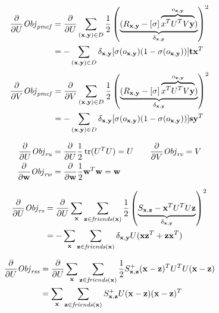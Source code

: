 \begin{align}
\frac{\partial}{\partial U} \mathit{Obj}_{\mathit{pmcf}} & = \frac{\partial}{\partial U} \sum_{(\mathbf{x},\mathbf{y}) \in D} \frac{1}{2} \left( \underbrace{(R_{\mathbf{x},\mathbf{y}} - [\sigma] \overbrace{x^T U^T V\mathbf{y}}^{o_{\mathbf{x},\mathbf{y}}})}_{\delta_{\mathbf{x},\mathbf{y}}} \right)^2 \nonumber \\
& = - \sum_{(\mathbf{x},\mathbf{y}) \in D} \delta_{\mathbf{x},\mathbf{y}} [\sigma(o_{\mathbf{x},\mathbf{y}}) (1 - \sigma(o_{\mathbf{x},\mathbf{y}}))] \mathbf{t} \mathbf{x}^T \nonumber 
\end{align}
\begin{align}
\frac{\partial}{\partial V} \mathit{Obj}_{\mathit{pmcf}} & = \frac{\partial}{\partial V} \sum_{(\mathbf{x},\mathbf{y}) \in D} \frac{1}{2} \left( \underbrace{(R_{\mathbf{x},\mathbf{y}} - [\sigma] \overbrace{x^T U^T V\mathbf{y}}^{o_{\mathbf{x},\mathbf{y}}})}_{\delta_{\mathbf{x},\mathbf{y}}} \right)^2 \nonumber \\
& = - \sum_{(\mathbf{x},\mathbf{y}) \in D} \delta_{\mathbf{x},\mathbf{y}} [\sigma(o_{\mathbf{x},\mathbf{y}}) (1 - \sigma(o_{\mathbf{x},\mathbf{y}}))] \mathbf{s} \mathbf{y}^T \nonumber 
\end{align}

\begin{align}
\frac{\partial}{\partial U} \mathit{Obj}_{\mathit{ru}} & = \frac{\partial}{\partial U} \frac{1}{2} \operatorname{tr}(U^T U) = U \nonumber \qquad \frac{\partial}{\partial V} \mathit{Obj}_{\mathit{rv}} = V \\
\frac{\partial}{\partial \mathbf{w}} \mathit{Obj}_{\mathit{rw}} & = \frac{\partial}{\partial \mathbf{w}} \frac{1}{2} \mathbf{w}^T \mathbf{w} = \mathbf{w} \nonumber
\end{align}

\begin{align}
\frac{\partial}{\partial U} \mathit{Obj}_{\mathit{rs}} & = \frac{\partial}{\partial U} \sum_{\mathbf{x}} \sum_{\mathbf{z} \in \mathit{friends}(\mathbf{x})} \frac{1}{2} \left( \underbrace{S_{\mathbf{x},\mathbf{z}} - \mathbf{x}^T U^T U \mathbf{z}}_{\delta_{\mathbf{x},\mathbf{y}}} \right)^2 \nonumber \\
& = - \sum_{\mathbf{x}} \sum_{\mathbf{z} \in \mathit{friends}(\mathbf{x})} \delta_{\mathbf{x},\mathbf{y}} U (\mathbf{x} \mathbf{z}^T + \mathbf{z} \mathbf{x}^T) \nonumber
\end{align}

\begin{align}
\frac{\partial}{\partial U} \mathit{Obj}_{\mathit{rss}} & = \frac{\partial}{\partial U} \sum_{\mathbf{x}} \sum_{\mathbf{z} \in \mathit{friends}(\mathbf{x})} \frac{1}{2} S^+_{\mathbf{x},\mathbf{z}} (\mathbf{x} - \mathbf{z})^T U^T U (\mathbf{x} - \mathbf{z}) \nonumber \\
& = \sum_{\mathbf{x}} \sum_{\mathbf{z} \in \mathit{friends}(\mathbf{x})} S^+_{\mathbf{x},\mathbf{z}} U (\mathbf{x} - \mathbf{z})(\mathbf{x} - \mathbf{z})^T \nonumber
\end{align}

